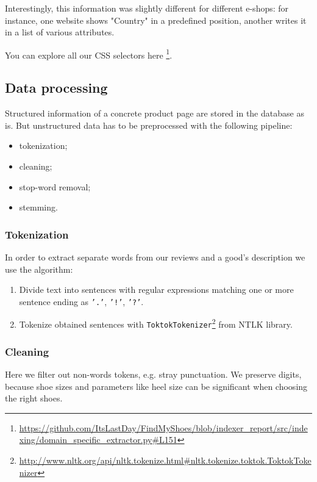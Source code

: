 Interestingly, this information was slightly different for different e-shops: for instance, one website shows "Country" in a predefined position, another writes it in a list of various attributes.

You can explore all our CSS selectors here
\footnote{\url{https://github.com/ItsLastDay/FindMyShoes/blob/indexer_report/src/indexing/domain_specific_extractor.py\#L151}}.

\subsection{Data processing} \label{data_processing}
Structured information of a concrete product page are stored in the database as is. But unstructured data has to be preprocessed with the following pipeline:
\begin{itemize}
\item tokenization;
\item cleaning;
\item stop-word removal;
\item stemming.
\end{itemize}

\subsubsection{Tokenization}
In order to extract separate words from our reviews and a good's description we use the algorithm:
\begin{enumerate}
    \item Divide text into sentences with regular expressions match\-ing one or more sentence ending as \texttt{'.'}, \texttt{'!'}, \texttt{'?'}.
    \item Tokenize obtained sentences with \texttt{ToktokTokenizer}\footnote{\url{http://www.nltk.org/api/nltk.tokenize.html\#nltk.tokenize.toktok.ToktokTokenizer}} from NTLK library\cite{nltk_book}. 
\end{enumerate}

\subsubsection{Cleaning}
Here we filter out non-words tokens, e.g. stray punctuation. 
We preserve digits, because shoe sizes and parameters like heel size can be significant when choosing the right shoes.

